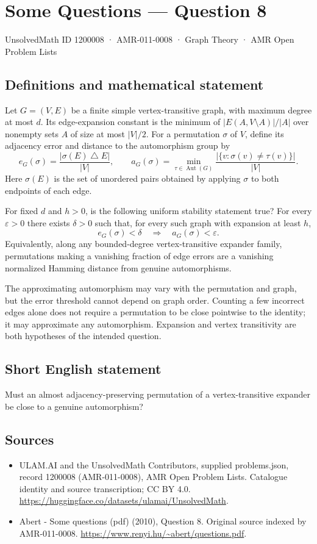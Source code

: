 \documentclass[11pt,a4paper]{article}
\begin{document}
\section*{Some Questions — Question 8}\label{1200008}
{\small UnsolvedMath ID 1200008 · AMR-011-0008 · Graph Theory · AMR Open Problem Lists}
\subsection{Definitions and mathematical statement}
Let $G=(V,E)$ be a finite simple vertex-transitive graph, with maximum degree at most $d$. Its edge-expansion constant is the minimum of $|E(A,V\setminus A)|/|A|$ over nonempty sets $A$ of size at most $|V|/2$. For a permutation $\sigma$ of $V$, define its adjacency error and distance to the automorphism group by
\[
 e_G(\sigma)=\frac{|\sigma(E)\mathbin{\triangle}E|}{|V|},\qquad
 a_G(\sigma)=\min_{\tau\in\operatorname{Aut}(G)}
            \frac{|\{v:\sigma(v)\ne\tau(v)\}|}{|V|}.
\]
Here $\sigma(E)$ is the set of unordered pairs obtained by applying $\sigma$ to both endpoints of each edge.

For fixed $d$ and $h>0$, is the following uniform stability statement true? For every $\varepsilon>0$ there exists $\delta>0$ such that, for every such graph with expansion at least $h$,
\[
 e_G(\sigma)<\delta\quad\Longrightarrow\quad a_G(\sigma)<\varepsilon.
\]
Equivalently, along any bounded-degree vertex-transitive expander family, permutations making a vanishing fraction of edge errors are a vanishing normalized Hamming distance from genuine automorphisms.

The approximating automorphism may vary with the permutation and graph, but the error threshold cannot depend on graph order. Counting a few incorrect edges alone does not require a permutation to be close pointwise to the identity; it may approximate any automorphism. Expansion and vertex transitivity are both hypotheses of the intended question.
\subsection{Short English statement}
Must an almost adjacency-preserving permutation of a vertex-transitive expander be close to a genuine automorphism?
\subsection{Sources}
\begin{itemize}
\item[S1] ULAM.AI and the UnsolvedMath Contributors, supplied problems.json, record 1200008 (AMR-011-0008), AMR Open Problem Lists. Catalogue identity and source transcription; CC BY 4.0.
\url{https://huggingface.co/datasets/ulamai/UnsolvedMath}.
\item[S2] Abert - Some questions (pdf) (2010), Question 8. Original source indexed by AMR-011-0008.
\url{https://www.renyi.hu/~abert/questions.pdf}.
\end{itemize}
\end{document}
